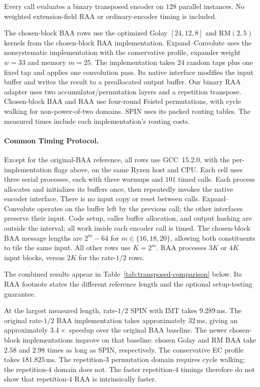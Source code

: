 Every call evaluates a binary
transposed encoder on $128$ parallel instances. No weighted extension-field
RAA or ordinary-encoder timing is included.

The chosen-block BAA rows use the optimized Golay $[24,12,8]$ and RM$(2,5)$ kernels
from the chosen-block BAA implementation. Expand--Convolute uses the
nonsystematic implementation with the conservative profile, expander weight $w=33$ and memory $m=25$.
The implementation takes $24$ random taps plus one fixed tap and applies
one convolution pass. Its native interface modifies the input buffer and
writes the result to a preallocated output buffer. Our binary RAA adapter
uses two accumulator/permutation layers and a repetition transpose.
Chosen-block BAA and RAA use four-round Feistel permutations, with cycle walking for
non-power-of-two domains. SPIN uses its packed routing tables.
The measured times include each implementation's routing costs.

\paragraph{Common Timing Protocol.}
Except for the original-BAA reference, all rows use GCC~15.2.0, with the
per-implementation flags above, on the same Ryzen host and CPU. Each cell uses three serial processes, each with
three warmups and $101$ timed calls. Each process allocates and initializes
its buffers once, then repeatedly invokes the native encoder interface.
There is no input copy or reset between calls. Expand--Convolute operates
on the buffer left by the previous call; the other interfaces preserve
their input. Code setup, caller buffer allocation, and output hashing
are outside the interval; all work inside each encoder call is timed.
The chosen-block BAA message lengths are $2^m-64$ for $m\in\{16,18,20\}$, allowing
both constituents to tile the same input. All other rows use $K=2^m$.
RAA processes $3K$ or $4K$ input blocks, versus $2K$ for the rate-$1/2$ rows.

The combined results appear in Table~\ref{tab:transposed-comparison} below.
Its RAA footnote states the different
reference length and the optional setup-testing guarantee.

At the largest measured length, rate-$1/2$ SPIN with IMT takes $9.289$\,ms.
The original rate-$1/2$ BAA implementation takes approximately $32$\,ms,
giving an approximately $3.4\times$ speedup over the original BAA baseline.
The newer chosen-block implementations improve on that baseline:
chosen Golay and RM BAA take $2.58$ and $2.98$ times as long as SPIN,
respectively. The conservative EC profile takes $181.825$\,ms.
The repetition-$3$ permutation domain requires cycle walking; the
repetition-$4$ domain does not. The faster repetition-$4$ timings therefore
do not show that repetition-$4$ RAA is intrinsically faster.

